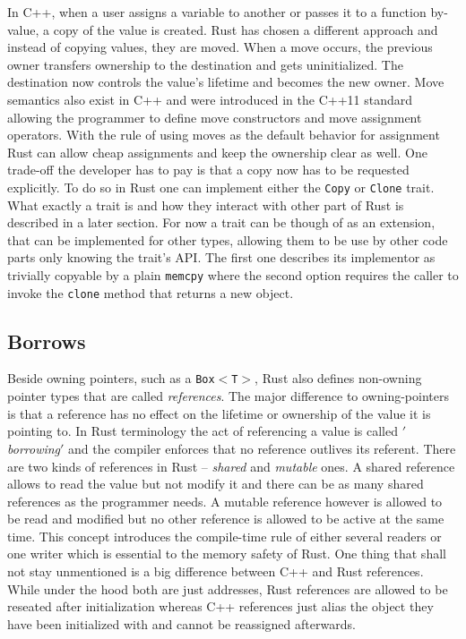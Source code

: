 In C++, when a user assigns a variable to another or passes it to a function by-value, a copy of the value is created. Rust has chosen a different approach and instead of copying values, they are moved. When a move occurs,  the previous owner transfers ownership to the destination and gets uninitialized. The destination now controls the value's lifetime and becomes the new owner. Move semantics also exist in C++ and were introduced in the C++11 standard allowing the programmer to define move constructors and move assignment operators. \cite{CppMove} With the rule of using moves as the default behavior for assignment Rust can allow cheap assignments and keep the ownership clear as well. One trade-off the developer has to pay is that a copy now has to be requested explicitly. To do so in Rust one can implement either the \texttt{Copy} or \texttt{Clone} trait. What exactly a trait is and how they interact with other part of Rust is described in a later section. For now a trait can be though of as an extension, that can be implemented for other types, allowing them to be use by other code parts only knowing the trait's \ac{API}. The first one describes its implementor as trivially copyable by a plain \texttt{memcpy} where the second option requires the caller to invoke the \texttt{clone} method that returns a new object. \cite[Chapter 4. Ownership]{ProgrammingRust}

\subsection{Borrows}

Beside owning pointers, such as a \texttt{Box$<$T$>$}, Rust also defines non-owning pointer types that are called \textit{references}. The major difference to owning-pointers is that a reference has no effect on the lifetime or ownership of the value it is pointing to. In Rust terminology the act of referencing a value is called \textit{$'$borrowing$'$} and the compiler enforces that no reference outlives its referent. There are two kinds of references in Rust -- \textit{shared} and \textit{mutable} ones. A shared reference allows to read the value but not modify it and there can be as many shared references as the programmer needs. A mutable reference however is allowed to be read and modified but no other reference is allowed to be active at the same time. This concept introduces the compile-time rule of either several readers or one writer which is essential to the memory safety of Rust. One thing that shall not stay unmentioned is a big difference between C++ and Rust references. While under the hood both are just addresses, Rust references are allowed to be reseated after initialization whereas C++ references just alias the object they have been initialized with and cannot be reassigned afterwards. \cite[Chapter 5. References]{ProgrammingRust}

